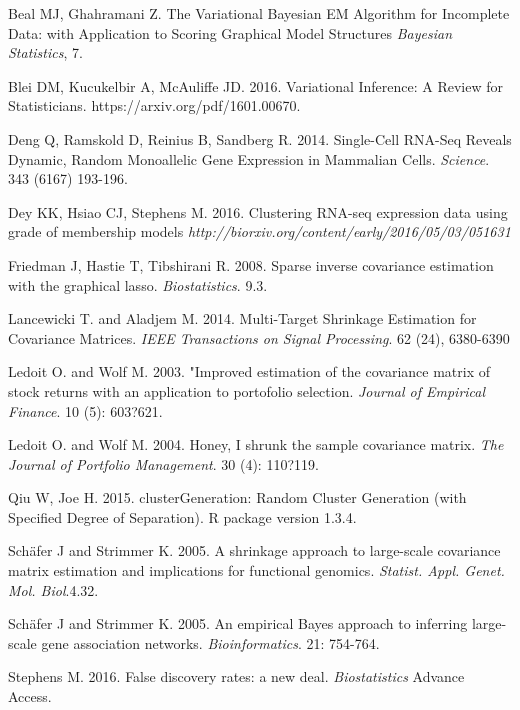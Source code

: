 \begin{thebibliography}{9}

Beal MJ, Ghahramani Z.
The Variational Bayesian EM Algorithm for Incomplete Data: with Application to Scoring Graphical Model Structures
\textit{Bayesian Statistics}, 7.


Blei DM, Kucukelbir A, McAuliffe JD. 2016.
Variational Inference: A Review for Statisticians.
https://arxiv.org/pdf/1601.00670.

Deng Q,  Ramskold D,  Reinius B,  Sandberg R. 2014.
Single-Cell RNA-Seq Reveals Dynamic, Random Monoallelic Gene Expression in Mammalian Cells.
\textit{Science}.  343 (6167) 193-196.

Dey KK,  Hsiao CJ,  Stephens M. 2016.
Clustering RNA-seq expression data using grade of membership models
\textit{http://biorxiv.org/content/early/2016/05/03/051631}

Friedman J,  Hastie T,  Tibshirani R. 2008.
Sparse inverse covariance estimation with the graphical lasso. 
\textit{Biostatistics}. 9.3.

Lancewicki T. and Aladjem M. 2014.
Multi-Target Shrinkage Estimation for Covariance Matrices.
\textit{IEEE Transactions on Signal Processing}. 62 (24), 6380-6390

Ledoit O. and Wolf  M. 2003. 
"Improved estimation of the covariance matrix of stock returns with an application to portofolio selection.
\textit{Journal of Empirical Finance}. 10 (5): 603?621.

Ledoit O. and Wolf  M. 2004. 
Honey, I shrunk the sample covariance matrix.
\textit{The Journal of Portfolio Management}. 30 (4): 110?119.

Qiu W, Joe H. 2015.
clusterGeneration: Random Cluster Generation (with Specified Degree of Separation).
R package version 1.3.4.

Sch\"{a}fer J and Strimmer K.  2005. 
A shrinkage approach to large-scale covariance matrix estimation and implications for functional genomics. 
\textit{Statist. Appl. Genet. Mol. Biol}.4.32.

Sch\"{a}fer J and Strimmer K.  2005. 
An empirical Bayes approach to inferring large-scale gene association networks. 
\textit{Bioinformatics}. 21: 754-764.

Stephens M. 2016. 
False discovery rates: a new deal. 
\textit{Biostatistics} Advance Access.


\end{thebibliography}
